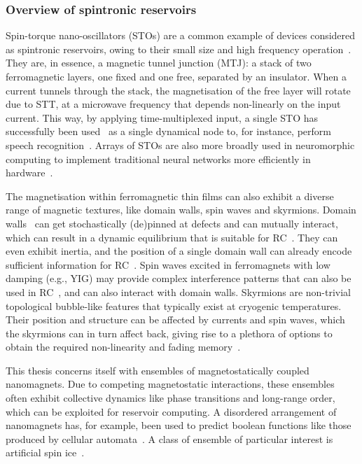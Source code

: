 \subsubsection{Overview of spintronic reservoirs}
Spin-torque nano-oscillators (STOs) are a common example of devices considered as spintronic reservoirs, owing to their small size and high frequency operation~\cite{tsunegi2019STOforcedsyncRC}.
They are, in essence, a magnetic tunnel junction (MTJ): a stack of two ferromagnetic layers, one fixed and one free, separated by an insulator.
When a current tunnels through the stack, the magnetisation of the free layer will rotate due to STT, at a microwave frequency that depends non-linearly on the input current.
This way, by applying time-multiplexed input, a single STO has successfully been used~\cite{tsunegi2019STOforcedsyncRC} as a single dynamical node to, for instance, perform speech recognition~\cite{STO_RC_Riou2021,NeuromorphicOscillators}.
Arrays of STOs are also more broadly used in neuromorphic computing to implement traditional neural networks more efficiently in hardware~\cite{VowelRecognition4STO}. \par
The magnetisation within ferromagnetic thin films can also exhibit a diverse range of magnetic textures, like domain walls, spin waves and skyrmions.
Domain walls~\cite{Venkat_2024} can get stochastically (de)pinned at defects and can mutually interact, which can result in a dynamic equilibrium that is suitable for RC~\cite{DynamicEmergence_NanomagneticSystem}.
They can even exhibit inertia, and the position of a single domain wall can already encode sufficient information for RC~\cite{RC_DW}.
Spin waves excited in ferromagnets with low damping (e.g., YIG) may provide complex interference patterns that can also be used in RC~\cite{RC_SpinWaveInterference}, and can also interact with domain walls.
Skyrmions are non-trivial topological bubble-like features that typically exist at cryogenic temperatures.
Their position and structure can be affected by currents and spin waves, which the skyrmions can in turn affect back, giving rise to a plethora of options to obtain the required non-linearity and fading memory~\cite{RC_TaskAgnosticMetrics_v2,RC_SkyrmionCrystalSW}. \par
This thesis concerns itself with ensembles of magnetostatically coupled nanomagnets.
Due to competing magnetostatic interactions, these ensembles often exhibit collective dynamics like phase transitions and long-range order, which can be exploited for reservoir computing.
A disordered arrangement of nanomagnets has, for example, been used to predict boolean functions like those produced by cellular automata~\cite{RC_PassiveFrustratedNM,RC_DipoleNanomagnets}. %
A class of ensemble of particular interest is artificial spin ice~\cite{RC_ASI}.

